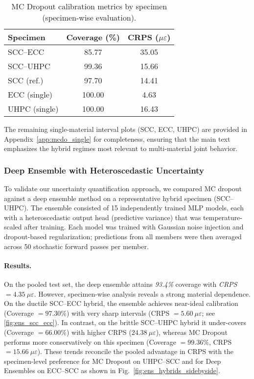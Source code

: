 \documentclass{article}
\begin{document}
\begin{table}[h]
\centering
\caption{MC Dropout calibration metrics by specimen (specimen-wise evaluation).}
\label{tab:mc_dropout_specimens_full}
\begin{tabular}{lcc}
\hline
Specimen & Coverage (\%) & CRPS ($\mu\varepsilon$) \\
\hline
SCC--ECC & 85.77 & 35.05 \\
SCC--UHPC & 99.36 & 15.66 \\
SCC (ref.) & 97.70 & 14.41 \\
ECC (single) & 100.00 & 4.63 \\
UHPC (single) & 100.00 & 16.43 \\
\hline
\end{tabular}
\end{table}

\noindent The remaining single-material interval plots (SCC, ECC, UHPC) are provided in Appendix~\ref{app:mcdo_single} for completeness, ensuring that the main text emphasizes the hybrid regimes most relevant to multi-material joint behavior.



\subsubsection{Deep Ensemble with Heteroscedastic Uncertainty}
\label{subsec:Deep_En_He_Un}

To validate our uncertainty quantification approach, we compared MC dropout against a deep ensemble method \cite{lakshminarayanan2017simple} on a representative hybrid specimen (SCC–UHPC). The ensemble consisted of 15 independently trained MLP models, each with a heteroscedastic output head (predictive variance) that was temperature-scaled after training. Each model was trained with Gaussian noise injection and dropout-based regularization; predictions from all members were then averaged across 50 stochastic forward passes per member.

\paragraph{Results.}
On the pooled test set, the deep ensemble attains \emph{93.4\%} coverage with \emph{CRPS $=4.35~\mu\varepsilon$}. However, specimen-wise analysis reveals a strong material dependence. On the ductile SCC--ECC hybrid, the ensemble achieves near-ideal calibration (Coverage $=97.30\%$) with very sharp intervals (CRPS $=5.60~\mu\varepsilon$; see \cref{fig:ens_scc_ecc}). In contrast, on the brittle SCC--UHPC hybrid it under-covers (Coverage $=66.00\%$) with higher CRPS ($24.38~\mu\varepsilon$), whereas MC Dropout performs more conservatively on this specimen (Coverage $=99.36\%$, CRPS $=15.66~\mu\varepsilon$). These trends reconcile the pooled advantage in CRPS with the specimen-level preference for MC Dropout on UHPC--SCC and for Deep Ensembles on ECC--SCC as shown in Fig.~\ref{fig:ens_hybrids_sidebyside}.
\end{document}
